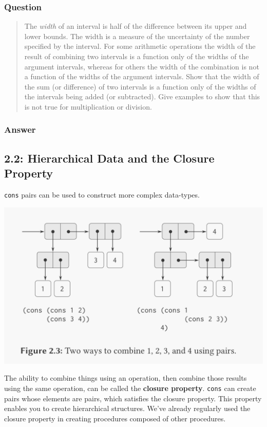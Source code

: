 \documentclass[final,fleqn,titlepage]{article}
\begin{document}
\subsubsection{Question}
\label{sec:org4a49b26}
\begin{quote}
The \emph{width} of an interval is half of the difference between its upper and lower
bounds. The width is a measure of the uncertainty of the number specified by the
interval. For some arithmetic operations the width of the result of combining
two intervals is a function only of the widths of the argument intervals,
whereas for others the width of the combination is not a function of the widths
of the argument intervals. Show that the width of the sum (or difference) of two
intervals is a function only of the widths of the intervals being added (or
subtracted). Give examples to show that this is not true for multiplication or
division.
\end{quote}
\subsubsection{Answer}
\label{sec:org09e2107}

\subsection{2.2: Hierarchical Data and the Closure Property}
\label{sec:org38282ba}
\texttt{cons} pairs can be used to construct more complex data-types.

\begin{center}
\includegraphics[width=.9\linewidth]{2/cons-cells.jpeg}
\end{center}

The ability to combine things using an operation, then combine those results
using the same operation, can be called the \textbf{closure property}. \texttt{cons} can
create pairs whose elements are pairs, which satisfies the closure property.
This property enables you to create hierarchical structures. We've already
regularly used the closure property in creating procedures composed of other
procedures.
\end{document}
